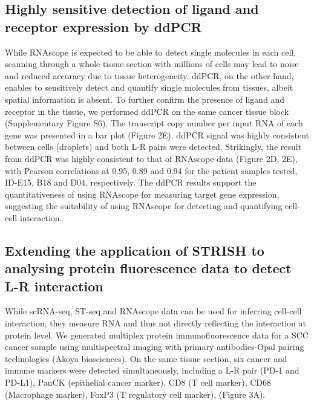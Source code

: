 \subsection{Highly sensitive detection of ligand and receptor expression by ddPCR}
While RNAscope is expected to be able to detect single molecules in each cell, scanning through a whole tissue section with millions of cells may lead to noise and reduced accuracy due to tissue heterogeneity. ddPCR, on the other hand, enables to sensitively detect and quantify single molecules from tissues, albeit spatial information is absent. To further confirm the presence of ligand and receptor in the tissue, we performed ddPCR on the same cancer tissue block (Supplementary Figure S6). The transcript copy number per input RNA of each gene was presented in a bar plot (Figure 2E). ddPCR signal was highly consistent between cells (droplets) and both L-R pairs were detected. Strikingly, the result from ddPCR was highly consistent to that of RNAscope data (Figure 2D, 2E), with Pearson correlations at 0.95, 0.89 and 0.94 for the patient samples tested, ID-E15, B18 and D04, respectively. The ddPCR results support the quantitativeness of using RNAscope for measuring target gene expression, suggesting the suitability of using RNAscope for detecting and quantifying cell-cell interaction. 

\subsection{Extending the application of STRISH to analysing protein fluorescence data to detect L-R interaction}
While scRNA-seq, ST-seq and RNAscope data can be used for inferring cell-cell interaction, they measure RNA and thus not directly reflecting the interaction at protein level. We generated multiplex protein immunofluorescence data for a SCC cancer sample using multispectral imaging with primary antibodies-Opal pairing technologies (Akoya biosciences). On the same tissue section, six cancer and immune markers were detected simultaneously, including a L-R pair (PD-1 and PD-L1), PanCK (epithelial cancer marker), CD8 (T cell marker), CD68 (Macrophage marker), FoxP3 (T regulatory cell marker), (Figure 3A). 

